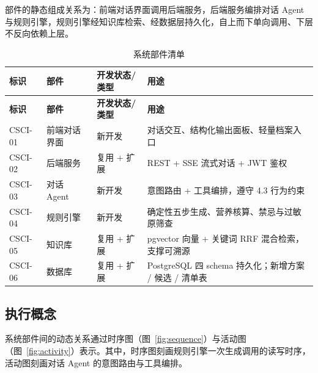 \documentclass[12pt,a4paper]{ctexart}
\begin{document}
部件的静态组成关系为：前端对话界面调用后端服务，后端服务编排对话 Agent 与规则引擎，规则引擎经知识库检索、经数据层持久化，自上而下单向调用、下层不反向依赖上层。

\begin{xltabular}{\linewidth}{p{1.6cm}p{2.6cm}p{2.8cm}L}
\caption{系统部件清单\label{tab:cscu}} \\
\toprule
\textbf{标识} & \textbf{部件} & \textbf{开发状态/类型} & \textbf{用途} \\
\midrule
\endfirsthead
\toprule
\textbf{标识} & \textbf{部件} & \textbf{开发状态/类型} & \textbf{用途} \\
\midrule
\endhead
CSCI-01 & 前端对话界面 & 新开发 & 对话交互、结构化输出面板、轻量档案入口 \\
CSCI-02 & 后端服务 & 复用 + 扩展 & REST + SSE 流式对话 + JWT 鉴权 \\
CSCI-03 & 对话 Agent & 新开发 & 意图路由 + 工具编排，遵守 4.3 行为约束 \\
CSCI-04 & 规则引擎 & 新开发 & 确定性五步生成、营养核算、禁忌与过敏原筛查 \\
CSCI-05 & 知识库 & 复用 + 扩展 & pgvector 向量 + 关键词 RRF 混合检索，支撑可溯源 \\
CSCI-06 & 数据库 & 复用 + 扩展 & PostgreSQL 四 schema 持久化；新增方案 / 候选 / 清单表 \\
\bottomrule
\end{xltabular}

\subsection{执行概念}

系统部件间的动态关系通过时序图（图~\ref{fig:sequence}）与活动图（图~\ref{fig:activity}）表示。其中，时序图刻画规则引擎一次生成调用的读写时序，活动图刻画对话 Agent 的意图路由与工具编排。
\end{document}
